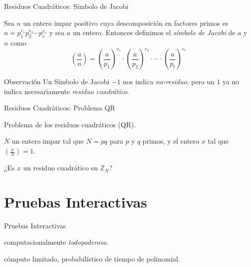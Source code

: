 \documentclass{beamer}
\begin{document}
\begin{frame}{Residuos Cuadráticos: Símbolo de Jacobi}
	\begin{definition}
		Sea $n$ un entero impar positivo cuya descomposici\'on en factores primos es $n = p_1^{e_1} p_2^{e_2} \cdots p_r^{e_r}$ y sea $a$ un entero. Entonces definimos
		el \textit{s\'imbolo de Jacobi} de $a$ y $n$ como
		\[\left( \dfrac{a}{n} \right) = \left( \dfrac{a}{p_1} \right)^{e_1} \cdot \left( \dfrac{a}{p_2} \right)^{e_2} \cdot \cdots \cdot \left( \dfrac{a}{p_t} \right)^{e_t}\]
	\end{definition}
	\begin{alertblock}{Observación}
		Un Símbolo de Jacobi $-1$ nos indica \textit{no-residuo}, pero un $1$ ya no indica necesariamente \textit{residuo cuadrático}.
	\end{alertblock}
\end{frame}


\begin{frame}{Residuos Cuadráticos: Problema QR}
	\begin{description}[Parámetros]
		\item[Nombre] Problema de los residuos cuadr\'aticos (QR).
		\item[Parámetros] $N$ un entero impar tal que $N = pq$ para $p$ y $q$ primos, y el entero $x$ tal que $\left( \frac{x}{N} \right) = 1$.
		\item[Pregunta] ¿Es $x$ un residuo cuadrático en ${\mathbb Z}_N$?
	\end{description}
\end{frame}


\section{Pruebas Interactivas}

\begin{frame}{Pruebas Interactivas}

\begin{description}[Q]
	\item[Probador (P)] computacionalmente \textit{todopoderosa}.
	\item[Verificador (V)] cómputo limitado, probabilístico de tiempo de polinomial.
\end{description}

\end{frame}
\end{document}
